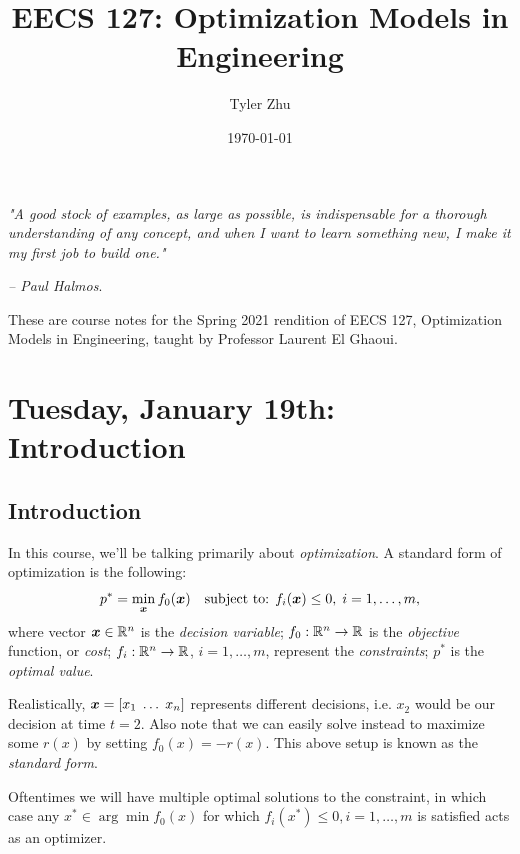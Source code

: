 \documentclass[11 pt]{scrartcl}
\begin{document}
 
\title{\Large EECS 127: Optimization Models in Engineering}
\author{\large Tyler Zhu}
\date{\large\today}

\maketitle 

\begin{center}
\begin{displayquote}
    \emph{"A good stock of examples, as large as possible, is indispensable for a thorough understanding of any concept, and when I want to learn something new, I make it my first job to build one."} \\ \begin{flushright} \emph{– Paul Halmos}.  \end{flushright}
\end{displayquote}
\end{center}


These are course notes for the Spring 2021 rendition of EECS 127, Optimization Models in Engineering, taught by Professor Laurent El Ghaoui.

\tableofcontents 

\newpage

\section{Tuesday, January 19th: Introduction}
\subsection{Introduction}
In this course, we'll be talking primarily about \emph{optimization}. 
A standard form of optimization is the following: 
\[ p^* = \min_{\bm{x}} f_0({\bm{x}})\quad \text{subject to: } f_i({\bm{x}}) \leq 0,\; i=1,\dots, m,\] 
where 
\itemnum
    \ii vector ${\bm{x}}\in \mathbb R^n$ is the \emph{decision variable}; 
    \ii $f_0: \mathbb R^n \to \mathbb R$ is the \emph{objective} function, or \emph{cost}; 
    \ii $f_i: \mathbb R^n\to \mathbb R$, $i=1,\dots, m$, represent the \emph{constraints}; 
    \ii $p^*$ is the \emph{optimal value}. 
\itemend

Realistically, ${\bm{x}} = [x_1\; \dots\; x_n]$ represents different decisions, i.e. $x_2$ would be our decision at time $t=2$. 
Also note that we can easily solve instead to maximize some $r(x)$ by setting $f_0(x) = -r(x)$. 
This above setup is known as the \emph{standard form}. 

Oftentimes we will have multiple optimal solutions to the constraint, in which case any $x^* \in \arg\min f_0(x)$ for which $f_i(x^*) \leq 0, i=1, \dots, m$ is satisfied acts as an optimizer.
\end{document}
